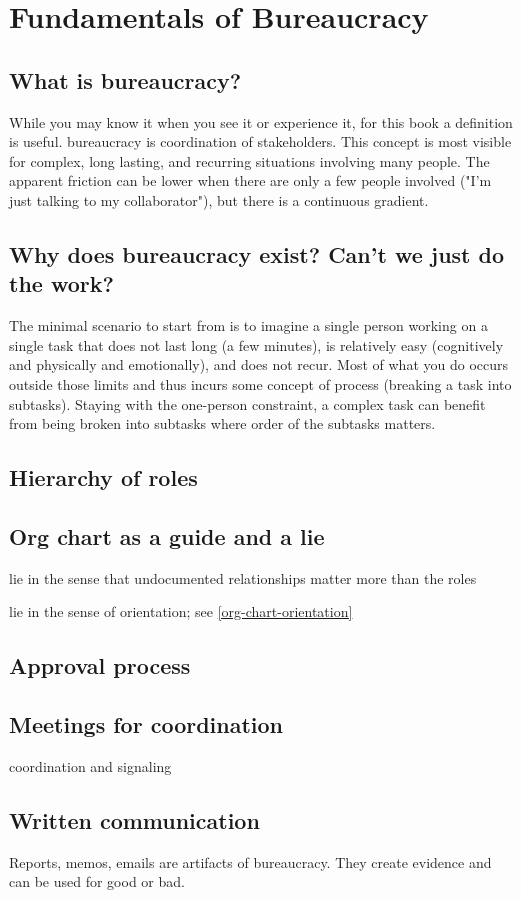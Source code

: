 \section{Fundamentals of Bureaucracy}

\subsection{What is bureaucracy?}
While you may know it when you see it or experience it, for this book a definition is useful. 
\gls{bureaucracy} is coordination of stakeholders. This concept is most visible for complex, long lasting, and recurring situations involving many people. The apparent friction can be lower when there are only a few people involved ("I'm just talking to my collaborator"), but there is a continuous gradient. 


\subsection{Why does bureaucracy exist? Can't we just do the work?}

The minimal scenario to start from is to imagine a single person working on a single task that does not last long (a few minutes), is relatively easy (cognitively and physically and emotionally), and does not recur. Most of what you do occurs outside those limits and thus incurs some concept of \gls{process} (breaking a task into subtasks). Staying with the one-person constraint, a complex task can benefit from being broken into subtasks where order of the subtasks matters. 




\subsection{Hierarchy of roles}

\subsection{Org chart as a guide and a lie}

lie in the sense that undocumented relationships matter more than the roles

lie in the sense of orientation; see \ref{org-chart-orientation}

\subsection{Approval process}

\subsection{Meetings for coordination}

coordination and signaling

\subsection{Written communication}

Reports, memos, emails are artifacts of bureaucracy. They create evidence and can be used for good or bad. 

